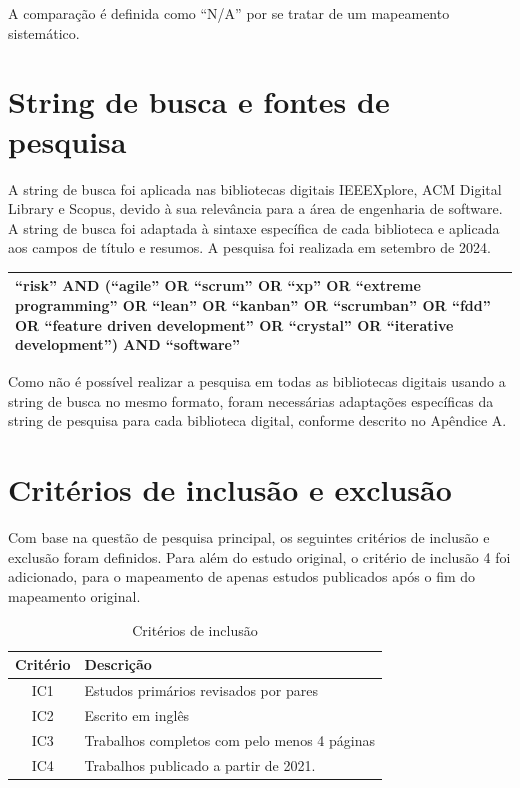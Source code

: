 \documentclass[
	12pt,
	openright,
	twoside,
	a4paper,
	english,
	brazil
	]{abntex2}
\begin{document}
A comparação é definida como “N/A” por se tratar de um mapeamento sistemático.

\section{String de busca e fontes de pesquisa}

A string de busca foi aplicada nas bibliotecas digitais IEEEXplore, ACM Digital Library e Scopus, devido à sua relevância para a área de engenharia de software. A string de busca foi adaptada à sintaxe específica de cada biblioteca e aplicada aos campos de título e resumos. A pesquisa foi realizada em setembro de 2024.

\begin{table}[h!]
  \centering
  \begin{tabular}{|p{15cm}|}
  \hline
  “risk” AND (“agile” OR “scrum” OR “xp” OR “extreme programming” OR “lean” OR “kanban” OR “scrumban” OR “fdd” OR “feature driven development” OR “crystal” OR “iterative development”) AND “software” \\ \hline
  \end{tabular}
  \label{tab:consulta-pesquisa}
\end{table}
  
Como não é possível realizar a pesquisa em todas as bibliotecas digitais usando a string de busca no mesmo formato, foram necessárias adaptações específicas da string de pesquisa para cada biblioteca digital, conforme descrito no Apêndice A.


\section{Critérios de inclusão e exclusão}

Com base na questão de pesquisa principal, os seguintes critérios de inclusão e exclusão foram definidos. Para além do estudo original, o critério de inclusão 4 foi adicionado, para o mapeamento de apenas estudos publicados após o fim do mapeamento original.

\begin{table}[h!]
  \centering
  \caption{Critérios de inclusão}
  \begin{tabular}{|c|l|}
  \hline
  \textbf{Critério} & \textbf{Descrição} \\ \hline
  IC1 & Estudos primários revisados por pares \\ \hline
  IC2 & Escrito em inglês \\ \hline
  IC3 & Trabalhos completos com pelo menos 4 páginas \\ \hline
  IC4 & Trabalhos publicado a partir de 2021. \\ \hline
  \end{tabular}
\end{table}
  
\end{document}

